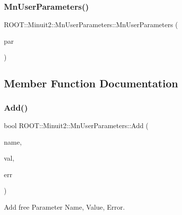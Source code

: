 \subsubsection{\texorpdfstring{MnUserParameters()}{MnUserParameters()}\hspace{0.1cm}{\footnotesize\ttfamily [9/9]}}
{\footnotesize\ttfamily R\+O\+O\+T\+::\+Minuit2\+::\+Mn\+User\+Parameters\+::\+Mn\+User\+Parameters (\begin{DoxyParamCaption}\item[{const \mbox{\hyperlink{classROOT_1_1Minuit2_1_1MnUserParameters}{Mn\+User\+Parameters}} \&}]{par }\end{DoxyParamCaption})\hspace{0.3cm}{\ttfamily [inline]}}



\subsection{Member Function Documentation}
\mbox{\label{classROOT_1_1Minuit2_1_1MnUserParameters_a95405d43b783605dba2ead1ba3125ebc}} 
\subsubsection{\texorpdfstring{Add()}{Add()}\hspace{0.1cm}{\footnotesize\ttfamily [1/9]}}
{\footnotesize\ttfamily bool R\+O\+O\+T\+::\+Minuit2\+::\+Mn\+User\+Parameters\+::\+Add (\begin{DoxyParamCaption}\item[{const std\+::string \&}]{name,  }\item[{double}]{val,  }\item[{double}]{err }\end{DoxyParamCaption})}



Add free Parameter Name, Value, Error. 

